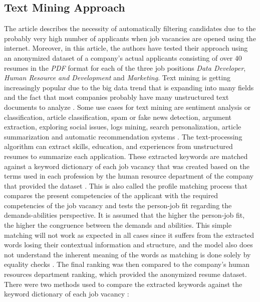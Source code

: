 \documentclass[draft,final]{thesisclass} %
\begin{document}
\subsection{Text Mining Approach} \label{text_mining_approach}
The article \textcite{text_mining_for_automatic_profiling} describes the necessity of automatically filtering candidates due to the probably very high number of applicants when job vacancies are opened using the internet.
Moreover, in this article, the authors have tested their approach using an anonymized dataset of a company's actual applicants consisting of over $40$ resumes in the \textit{PDF} format for each of the three job positions \textit{Data Developer}, \textit{Human Resource and Development} and \textit{Marketing}.
Text mining is getting increasingly popular due to the big data trend that is expanding into many fields and the fact that most companies probably have many unstructured text documents to analyze \parencite[49]{text_mining_for_automatic_profiling}.
Some use cases for text mining are sentiment analysis or classification, article classification, spam or fake news detection, argument extraction, exploring social issues, logs mining, search personalization, article summarization and automatic recommendation systems \parencite[49]{text_mining_for_automatic_profiling}.
The text-processing algorithm can extract skills, education, and experiences from unstructured resumes to summarize each application.
These extracted keywords are matched against a keyword dictionary of each job vacancy that was created based on the terms used in each profession by the human resource department of the company that provided the dataset \parencite[47]{text_mining_for_automatic_profiling}.
This is also called the profile matching process that compares the present competencies of the applicant with the required competencies of the job vacancy and tests the person-job fit regarding the demands-abilities perspective.
It is assumed that the higher the person-job fit, the higher the congruence between the demands and abilities.
This simple matching will not work as expected in all cases since it suffers from the extracted words losing their contextual information and structure, and the model also does not understand the inherent meaning of the words as matching is done solely by equality checks \parencite[517]{applicant_semantic_matching}.
The final ranking was then compared to the company's human resources department ranking, which provided the anonymized resume dataset.
There were two methods used to compare the extracted keywords against the keyword dictionary of each job vacancy \parencite[53-58]{text_mining_for_automatic_profiling}:
\end{document}
